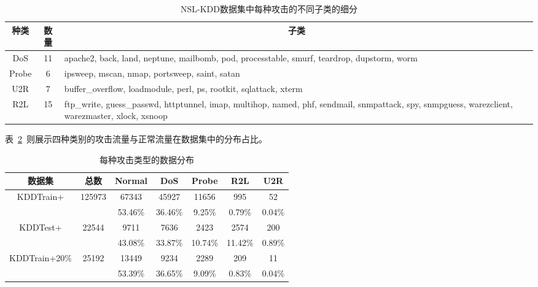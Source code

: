 \begin{table}[h]
	\caption{NSL-KDD数据集中每种攻击的不同子类的细分}
	\label{tab:attack_class}
	\begin{tabularx}{\textwidth}{@{}ccX@{}}
		\toprule
		\multicolumn{1}{c}{\textbf{种类}} & \multicolumn{1}{c}{\textbf{数量}} & \multicolumn{1}{c}{\textbf{子类}}                                                                                                                \\
		\midrule
		DoS                               & 11                                & apache2, back, land, neptune, mailbomb, pod, processtable, smurf, teardrop, dupstorm, worm                                                       \\
		Probe                             & 6                                 & ipsweep, mscan, nmap, portsweep, saint, satan                                                                                                    \\
		U2R                               & 7                                 & buffer\_overflow, loadmodule, perl, ps, rootkit, sqlattack, xterm                                                                                \\
		R2L                               & 15                                & ftp\_write, guess\_passwd, httptunnel, imap, multihop, named, phf, sendmail, snmpattack, spy, snmpguess, warezclient, warezmaster, xlock, xsnoop \\
		\bottomrule
	\end{tabularx}
\end{table}
表~\ref{tab:kdd_distribution}~则展示四种类别的攻击流量与正常流量在数据集中的分布占比。
\begin{table}[h]
	\caption{每种攻击类型的数据分布}
	\label{tab:kdd_distribution}
	\centering
	\begin{tabular}{ccccccc}
		\toprule
		\textbf{数据集}                & \textbf{总数}           & \textbf{Normal} & \textbf{DoS} & \textbf{Probe} & \textbf{R2L} & \textbf{U2R} \\
		\midrule
		\multirow{2}{*}{KDDTrain+}     & \multirow{2}{*}{125973} & 67343           & 45927        & 11656          & 995          & 52           \\
		                               &                         & 53.46\%         & 36.46\%      & 9.25\%         & 0.79\%       & 0.04\%       \\
		\multirow{2}{*}{KDDTest+}      & \multirow{2}{*}{22544}  & 9711            & 7636         & 2423           & 2574         & 200          \\
		                               &                         & 43.08\%         & 33.87\%      & 10.74\%        & 11.42\%      & 0.89\%       \\
		\multirow{2}{*}{KDDTrain+20\%} & \multirow{2}{*}{25192}  & 13449           & 9234         & 2289           & 209          & 11           \\
		                               &                         & 53.39\%         & 36.65\%      & 9.09\%         & 0.83\%       & 0.04\%       \\
		\bottomrule
	\end{tabular}
\end{table}
